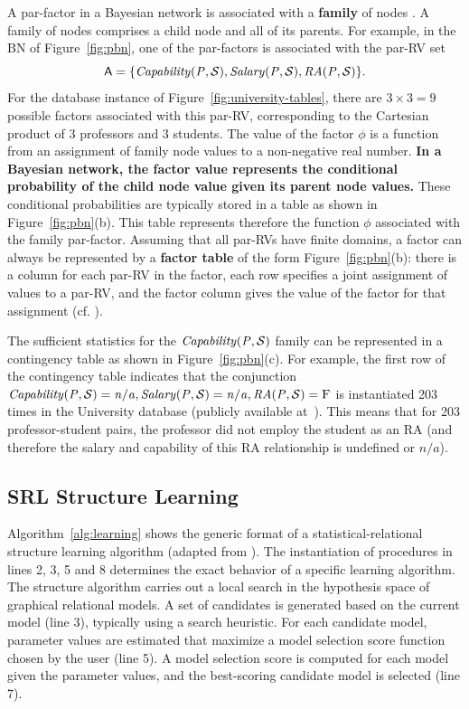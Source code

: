 \documentclass{sfuthesis}
\begin{document}
A par-factor in a Bayesian network is associated with a \textbf{family} of nodes \cite[Sec.2.2.1]{Kimmig2015}. A family of nodes comprises a child node and all of its parents. For example, in the BN of Figure~\ref{fig:pbn}, one of the par-factors is associated with the par-RV set
 $$\parrvs=\{\it{Capability}(\P,\S),\it{Salary}(\P,\S),\it{RA}(\P,\S)\}.$$ 
 For the database instance of Figure~\ref{fig:university-tables}, there are $3\times3=9$ possible factors associated with this par-RV, corresponding to the Cartesian product of 3 professors and 3 students. The value of the factor $\phi$ is a function from an assignment of family node values to a non-negative real number. \textbf {In a Bayesian network, the factor value represents the conditional probability of the child node value given its parent node values.} These conditional probabilities are typically stored in a table as shown in Figure~\ref{fig:pbn}(b). This table represents therefore the function $\phi$ associated with the family par-factor. Assuming that all par-RVs have finite domains, a factor can always be represented by a \textbf{factor table} of the form Figure~\ref{fig:pbn}(b): there is a column for each par-RV in the factor, each row specifies a joint assignment of values to a par-RV, and the factor column gives the value of the factor for that assignment (cf. \cite[Sec.2.2.1]{Kimmig2015}).



The sufficient statistics for the $\it{Capability}(\P,\S)$ family can be represented in a contingency table as shown in Figure~\ref{fig:pbn}(c). For example, the first row of the contingency table indicates that the conjunction $\it{Capability}(\P,\S)=n/a,\it{Salary}(\P,\S)=n/a,\it{RA}(\P,\S) =\false$ is instantiated 203 times in the University database (publicly available at~\cite{bib:bbsite}). This means that for 203 professor-student pairs, the professor did not employ the student as an RA (and therefore the salary and capability of this RA relationship is undefined or $n/a$).

\subsection{SRL Structure Learning}\label{sub:sla}

Algorithm~\ref{alg:learning} shows the generic format of a statistical-relational structure learning algorithm (adapted from 
\cite{Kimmig2015}%
). The instantiation of procedures in lines 2, 3, 5 and 8 determines the exact behavior of a specific learning algorithm. The structure algorithm carries out a local search in the hypothesis space of graphical relational models. A set of candidates is generated based on the current model (line 3), typically using a search heuristic. For each candidate model, parameter values are estimated that maximize a model selection score function chosen by the  user (line 5). A model selection score is computed for each model given the parameter values, and the best-scoring candidate model is selected (line 7). 
\end{document}
